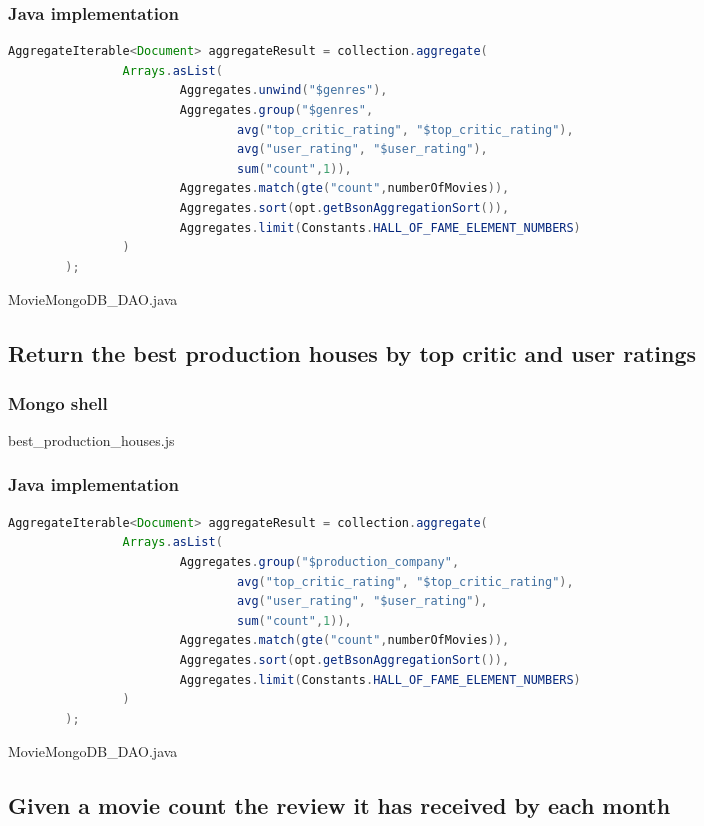 \subsubsection{Java implementation}
\begin{lstlisting}[language=Java]
AggregateIterable<Document> aggregateResult = collection.aggregate(
                Arrays.asList(
                        Aggregates.unwind("$genres"),
                        Aggregates.group("$genres",
                                avg("top_critic_rating", "$top_critic_rating"),
                                avg("user_rating", "$user_rating"),
                                sum("count",1)),
                        Aggregates.match(gte("count",numberOfMovies)),
                        Aggregates.sort(opt.getBsonAggregationSort()),
                        Aggregates.limit(Constants.HALL_OF_FAME_ELEMENT_NUMBERS)
                )
        );
\end{lstlisting}
\caption{MovieMongoDB_DAO.java}
\subsection{Return the best production houses by top critic and user ratings}\label{subsec:productionHouses}
\subsubsection{Mongo shell}

\caption{best_production_houses.js}
\subsubsection{Java implementation}
\begin{lstlisting}[language=Java]
AggregateIterable<Document> aggregateResult = collection.aggregate(
                Arrays.asList(
                        Aggregates.group("$production_company",
                                avg("top_critic_rating", "$top_critic_rating"),
                                avg("user_rating", "$user_rating"),
                                sum("count",1)),
                        Aggregates.match(gte("count",numberOfMovies)),
                        Aggregates.sort(opt.getBsonAggregationSort()),
                        Aggregates.limit(Constants.HALL_OF_FAME_ELEMENT_NUMBERS)
                )
        );
\end{lstlisting}
\caption{MovieMongoDB_DAO.java}
\subsection{Given a movie count the review it has received by each month}\label{subsec:reviewByYearMonth}
